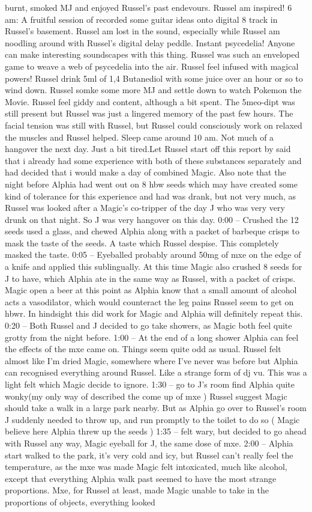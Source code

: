 \documentclass[12pt]{book}
\begin{document}
burnt, smoked MJ and enjoyed Russel's past endevours. Russel am inspired! 6 am: A fruitful session of recorded some guitar ideas onto digital 8 track in Russel's basement. Russel am lost in the sound, especially while Russel am noodling around with Russel's digital delay peddle. Instant psycedelia! Anyone can make interesting soundscapes with this thing. Russel was such an enveloped game to weave a web of psycedelia into the air. Russel feel infused with magical powers! Russel drink 5ml of 1,4 Butanediol with some juice over an hour or so to wind down. Russel somke some more MJ and settle down to watch Pokemon the Movie. Russel feel giddy and content, although a bit spent. The 5meo-dipt was still present but Russel was just a lingered memory of the past few hours. The facial tension was still with Russel, but Russel could consciously work on relaxed the muscles and Russel helped. Sleep came around 10 am. Not much of a hangover the next day. Just a bit tired.Let Russel start off this report by said that i already had some experience with both of these substances separately and had decided that i would make a day of combined Magic. Also note that the night before Alphia had went out on 8 hbw seeds which may have created some kind of tolerance for this experience and had was drank, but not very much, as Russel was looked after a Magic's co-tripper of the day J who was very very drunk on that night. So J was very hangover on this day. 0:00 -- Crushed the 12 seeds used a glass, and chewed Alphia along with a packet of barbeque crisps to mask the taste of the seeds. A taste which Russel despise. This completely masked the taste. 0:05 -- Eyeballed probably around 50mg of mxe on the edge of a knife and applied this sublingually. At this time Magic also crushed 8 seeds for J to have, which Alphia ate in the same way as Russel, with a packet of crisps. Magic open a beer at this point as Alphia know that a small amount of alcohol acts a vasodilator, which would counteract the leg pains Russel seem to get on hbwr. In hindsight this did work for Magic and Alphia will definitely repeat this. 0:20 -- Both Russel and J decided to go take showers, as Magic both feel quite grotty from the night before. 1:00 -- At the end of a long shower Alphia can feel the effects of the mxe came on. Things seem quite odd as usual. Russel felt almost like I'm dried Magic, somewhere where I've never was before but Alphia can recognised everything around Russel. Like a strange form of dj vu. This was a light felt which Magic decide to ignore. 1:30 -- go to J's room find Alphia quite wonky(my only way of described the come up of mxe ) Russel suggest Magic should take a walk in a large park nearby. But as Alphia go over to Russel's room J suddenly needed to throw up, and run promptly to the toilet to do so ( Magic believe here Alphia threw up the seeds ) 1:35 -- felt wary, but decided to go ahead with Russel any way, Magic eyeball for J, the same dose of mxe. 2:00 -- Alphia start walked to the park, it's very cold and icy, but Russel can't really feel the temperature, as the mxe was made Magic felt intoxicated, much like alcohol, except that everything Alphia walk past seemed to have the most strange proportions. Mxe, for Russel at least, made Magic unable to take in the proportions of objects, everything looked 
\end{document}
